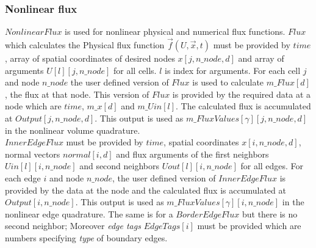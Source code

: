 \documentclass[BoSSSForSolvingConservationLaws.tex]{subfiles}
\begin{document}
\subsubsection{Nonlinear flux}
$NonlinearFlux$ is used for nonlinear physical and numerical flux functions. $Flux$ which calculates the Physical flux function $\vec{f}(U,\vec{x},t)$ must be provided by $time$, array of spatial coordinates of desired nodes $x[j,n\_node,d]$ and array of arguments $U[l][j,n\_node]$ for all cells. $l$ is index for arguments. For each cell $j$ and node $n\_node$ the user defined version of $Flux$ is used to calculate $m\_Flux[d]$, the flux at that node. This version of $Flux$ is provided by the required data at a node which are $time$, $m\_x[d]$ and $m\_Uin[l]$. The calculated flux is accumulated at $Output[j,n\_node,d]$. This output is used as $m\_FluxValues[\gamma][j,n\_node,d]$ in the nonlinear volume quadrature.\\
$InnerEdgeFlux$ must be provided by $time$, spatial coordinates $x[i,n\_node,d]$, normal vectors $normal[i,d]$ and flux arguments of the first neighbors $Uin[l][i,n\_node]$ and second neighbors $Uout[l][i,n\_node]$ for all edges. For each edge $i$ and node $n\_node$, the user defined version of $InnerEdgeFlux$ is provided by the data at the node and the calculated flux is accumulated at $Output[i,n\_node]$. This output is used as $m\_FluxValues[\gamma][i,n\_node]$ in the nonlinear edge quadrature.
The same is for a $BorderEdgeFlux$ but there is no second neighbor; Moreover \emph{edge tags} $EdgeTags[i]$ must be provided which are numbers specifying \emph{type} of boundary edges.
\end{document}

